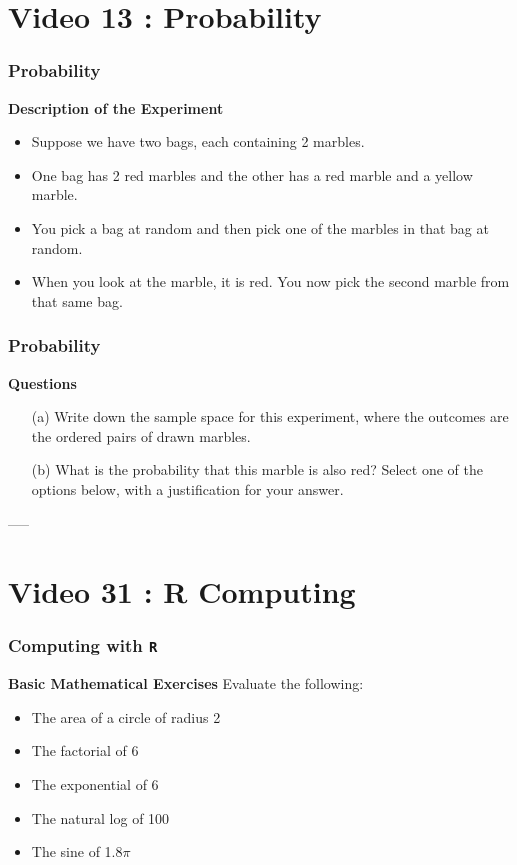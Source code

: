 
\section{Video 13 : Probability}
\begin{frame}
\frametitle{Probability}
\Large
\textbf{Description of the Experiment}
\begin{itemize}
\item Suppose we have two bags, each containing 2 marbles. 
\item One bag has 2 red marbles and
the other has a red marble and a yellow marble. 
\item You pick a bag at random and then pick
one of the marbles in that bag at random. 
\item When you look at the marble, it is red. 
You now pick the second marble from that same bag.
\end{itemize} 
\end{frame}

\begin{frame}
\frametitle{Probability}
\Large
\textbf{Questions}
\begin{itemize}
\item[(a)] Write down the sample space for this experiment, where the outcomes are the ordered pairs of drawn marbles.
\item[(b)] What is the probability that this marble
is also red? Select one of the options below, with a justification for your answer.
\end{itemize}
\end{frame}

----- %
\section{Video 31 : R Computing}
\begin{frame}[fragile]
\frametitle{Computing with \texttt{R}}
\Large
\textbf{Basic Mathematical Exercises} Evaluate the following:

\begin{itemize}
\item The area of a circle of radius 2
\item The factorial of 6
\item The exponential of 6
\item The natural log of 100
\item The sine of 1.8$\pi$
\end{itemize}
\end{frame}





